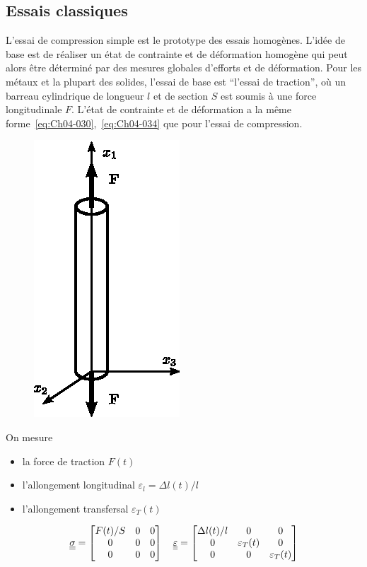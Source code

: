 \subsection{Essais classiques} \label{ssec:Ch04-1.4}
L'essai de compression simple est le prototype des essais homogènes.
L'idée de base est de réaliser un état de contrainte et de déformation homogène qui peut alors être déterminé par des mesures globales d'efforts et de déformation.
Pour les métaux et la plupart des solides, l'essai de base est ``l'essai de traction'', où un barreau cylindrique de longueur $l$ et de section $S$ est soumis à une force longitudinale $F$.
L'état de contrainte et de déformation a la même forme~\eqref{eq:Ch04-030},~\eqref{eq:Ch04-034} que pour l'essai de compression.

\begin{figure}
    \begin{center}
        \includegraphics{../images/T1_Ch04-0007}
    \end{center}
\end{figure}
On mesure 
\begin{itemize}
    \item la force de traction $F(t)$
    \item l'allongement longitudinal $\varepsilon_{l} = \Delta l(t)/l$
    \item l'allongement transfersal $\varepsilon_T(t)$
\end{itemize}
\begin{equation}
    \underline{\underline{\sigma}} =
    \begin{bmatrix}
        F(t)/S & 0 & 0 \\
        0 & 0 & 0 \\
        0 & 0 & 0
    \end{bmatrix}
    \quad
    \underline{\underline{\varepsilon}} = 
    \begin{bmatrix}
        \Delta l(t)/l & 0 & 0 \\
        0 & \varepsilon_T(t) & 0 \\
        0 & 0 & \varepsilon_T(t)
    \end{bmatrix}
    \label{eq:Ch04-035}
\end{equation}

